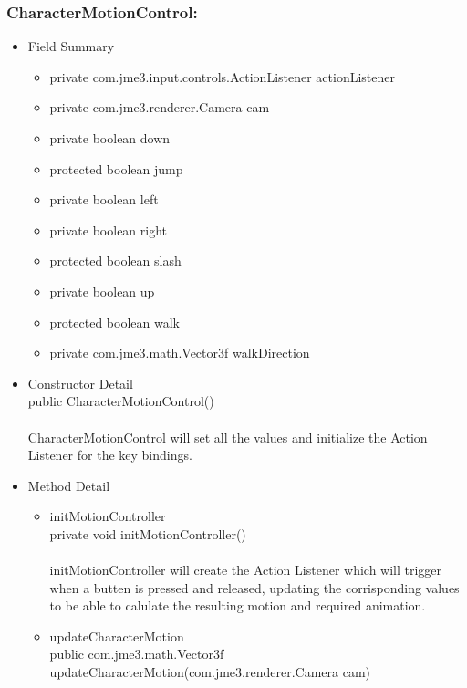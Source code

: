 \documentclass[letterpaper]{article}
\begin{document}
						\subsubsection*{CharacterMotionControl:}
						\vspace{0.1in}
							\begin{itemize}
								\item	Field Summary
										\begin{itemize}
											\item	private com.jme3.input.controls.ActionListener	actionListener 
											\item	private com.jme3.renderer.Camera	cam 
											\item	private boolean	down 
											\item	protected boolean	jump 
											\item	private boolean	left 
											\item	private boolean	right 
											\item	protected boolean	slash 
											\item	private boolean	up 
											\item	protected boolean	walk 
											\item	private com.jme3.math.Vector3f	walkDirection  
										\end{itemize}
								\item	Constructor Detail \\
										public CharacterMotionControl() \\ \\
										CharacterMotionControl will set all the values and initialize the Action Listener for the key bindings.
								\item	Method Detail 
										\begin{itemize}
											\item	initMotionController \\
													private void initMotionController() \\ \\
													initMotionController will create the Action Listener which will trigger when a butten is pressed and released, updating the corrisponding values to be able to calulate the resulting motion and required animation.
											\item	updateCharacterMotion \\
													public com.jme3.math.Vector3f updateCharacterMotion(com.jme3.renderer.Camera cam) \\ \\

\end{itemize}
\end{itemize}
\end{document}
